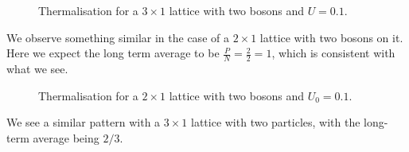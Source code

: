 \documentclass[prb, twocolumn, final]{revtex4-1}
\theoremstyle{plain}
\begin{document}
\begin{figure}[H]
     \caption{Thermalisation for a $3\times 1$ lattice
     with two bosons and $U=0.1$.}
\end{figure}

We observe something similar in the case of a $2\times1$ lattice with two
bosons on it. Here we expect the long term average to be $\frac{P}{N}=
\frac{2}{2}=1$, which is consistent with what we see.
\begin{figure}[H]
     \caption{Thermalisation for a $2\times 1$ lattice
     with two bosons and $U_{0}=0.1$.}
\end{figure}
We see a similar pattern with a $3\times1$ lattice with two particles, with the
long-term average being $2/3$.
\end{document}
